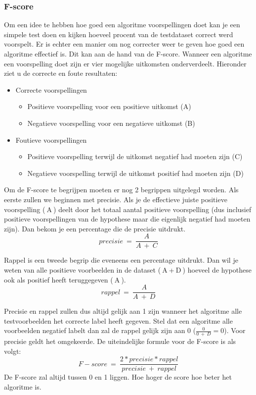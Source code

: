 \subsubsection{F-score}
\label{sec:fscore}
Om een idee te hebben hoe goed een algoritme voorspellingen doet kan je een simpele test doen en kijken hoeveel procent van de testdataset correct werd voorspelt. Er is echter een manier om nog correcter weer te geven hoe goed een algoritme effectief is. Dit kan aan de hand van de F-score. \newline
Wanneer een algoritme een voorspelling doet zijn er vier mogelijke uitkomsten onderverdeelt. Hieronder ziet u de correcte en foute resultaten:
\begin{itemize}
	\item Correcte voorspellingen
	\begin{itemize}
		\item Positieve voorspelling voor een positieve uitkomst  (A)
		\item Negatieve voorspelling voor een negatieve uitkomst (B)
	\end{itemize}
	\item Foutieve voorspellingen
	\begin{itemize}
		\item Positieve voorspelling terwijl de uitkomst negatief had moeten zijn (C)
		\item Negatieve voorspelling terwijl de uitkomst positief had moeten zijn (D)
	\end{itemize}
\end{itemize}

Om de F-score te begrijpen moeten er nog 2 begrippen uitgelegd worden. Als eerste zullen we beginnen met precisie. \newline 
Als je de effectieve juiste positieve voorspelling ($\:$A$\:$) deelt door het totaal aantal positieve voorspelling (dus inclusief positieve voorspellingen van de hypothese maar die eigenlijk negatief had moeten zijn). Dan bekom je een percentage die de precisie uitdrukt. $$precisie\:=\:\frac{A}{A\:+\:C}$$

Rappel is een tweede begrip die eveneens een percentage uitdrukt. Dan wil je weten van alle positieve voorbeelden in de dataset ($\:$A$\:$+$\:$D$\:$) hoeveel de hypothese ook als positief heeft teruggegeven ($\:$A$\:$). $$rappel\:=\: \frac{A}{A\:+\:D}$$

Precisie en rappel zullen dus altijd gelijk aan 1 zijn wanneer het algoritme alle testvoorbeelden het correcte label heeft gegeven. Stel dat een algoritme alle voorbeelden negatief labelt dan zal de rappel gelijk zijn aan 0 ($\frac{0}{0\:+\:D}=0$). Voor precisie geldt het omgekeerde.
De uiteindelijke formule voor de F-score is als volgt: 
$$F-score\:=\: \frac{2* precisie * rappel}{precisie\:+\:rappel}$$
De F-score zal altijd tussen 0 en 1 liggen. Hoe hoger de score hoe beter het algoritme is. 

